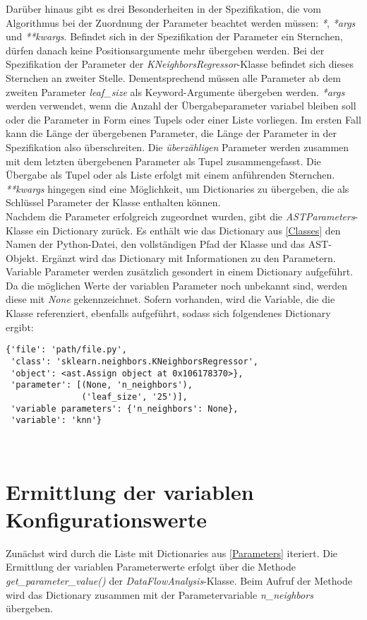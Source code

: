 \documentclass[german,bachelor]{swsLeipzig}
\begin{document}
Darüber hinaus gibt es drei Besonderheiten in der Spezifikation, die vom Algorithmus bei der Zuordnung der Parameter
beachtet werden müssen: \textit{*}, \textit{*args} und \textit{**kwargs}.
Befindet sich in der Spezifikation der Parameter ein Sternchen, dürfen danach keine Positionsargumente mehr
übergeben werden.
Bei der Spezifikation der Parameter der \textit{KNeighborsRegressor}-Klasse befindet sich dieses Sternchen an zweiter Stelle.
Dementsprechend müssen alle Parameter ab dem zweiten Parameter \textit{leaf\_size} als Keyword-Argumente übergeben werden.
\textit{*args} werden verwendet, wenn die Anzahl der Übergabeparameter variabel bleiben soll oder die Parameter in Form
eines Tupels oder einer Liste vorliegen.
Im ersten Fall kann die Länge der übergebenen Parameter, die Länge der Parameter in der Spezifikation also überschreiten.
Die \textit{überzähligen} Parameter werden zusammen mit dem letzten übergebenen Parameter als Tupel zusammengefasst.
Die Übergabe als Tupel oder als Liste erfolgt mit einem anführenden Sternchen.
\textit{**kwargs} hingegen sind eine Möglichkeit, um Dictionaries zu übergeben, die als Schlüssel Parameter der Klasse
enthalten können. \\

Nachdem die Parameter erfolgreich zugeordnet wurden, gibt die \textit{ASTParameters}-Klasse ein Dictionary zurück.
Es enthält wie das Dictionary aus \ref{Classes} den Namen der Python-Datei, den vollständigen Pfad der Klasse und das AST-Objekt.
Ergänzt wird das Dictionary mit Informationen zu den Parametern.
Variable Parameter werden zusätzlich gesondert in einem Dictionary aufgeführt.
Da die möglichen Werte der variablen Parameter noch unbekannt sind, werden diese mit \textit{None} gekennzeichnet.
Sofern vorhanden, wird die Variable, die die Klasse referenziert, ebenfalls aufgeführt, sodass sich folgendenes Dictionary ergibt:\\

\begin{lstlisting}[frame=single, basicstyle=\small]
{'file': 'path/file.py',
 'class': 'sklearn.neighbors.KNeighborsRegressor',
 'object': <ast.Assign object at 0x106178370>},
 'parameter': [(None, 'n_neighbors'),
               ('leaf_size', '25')],
 'variable parameters': {'n_neighbors': None},
 'variable': 'knn'}
\end{lstlisting}
\

\section{Ermittlung der variablen Konfigurationswerte}
Zunächst wird durch die Liste mit Dictionaries aus \ref{Parameters} iteriert.
Die Ermittlung der variablen Parameterwerte erfolgt über die Methode \textit{get\_parameter\_value()} der \textit{DataFlowAnalysis}-Klasse.
Beim Aufruf der Methode wird das Dictionary zusammen mit der Parametervariable \textit{n\_neighbors} übergeben.\\
\end{document}
